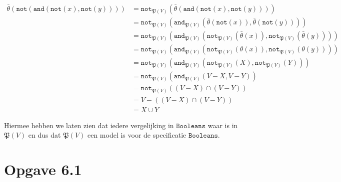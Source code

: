\documentclass[a4paper,11pt]{article}
\begin{document}
\begin{itemize}
\begin{align*}
\bar \theta(\texttt{not}(\texttt{and}(\texttt{not}(x), \texttt{not}(y))))
      &= \texttt{not}_{\mathfrak{P}(V)}(\bar \theta(\texttt{and}(\texttt{not}(x), \texttt{not}(y)))) \\
      &= \texttt{not}_{\mathfrak{P}(V)}(\texttt{and}_{\mathfrak{P}(V)}(\bar \theta(\texttt{not}(x)), \bar \theta(\texttt{not}(y)))) \\
      &= \texttt{not}_{\mathfrak{P}(V)}(\texttt{and}_{\mathfrak{P}(V)}(\texttt{not}_{\mathfrak{P}(V)}(\bar \theta(x)), \texttt{not}_{\mathfrak{P}(V)}(\bar \theta(y)))) \\
      &= \texttt{not}_{\mathfrak{P}(V)}(\texttt{and}_{\mathfrak{P}(V)}(\texttt{not}_{\mathfrak{P}(V)}(\theta(x)), \texttt{not}_{\mathfrak{P}(V)}(\theta(y)))) \\
      &= \texttt{not}_{\mathfrak{P}(V)}(\texttt{and}_{\mathfrak{P}(V)}(\texttt{not}_{\mathfrak{P}(V)}(X), \texttt{not}_{\mathfrak{P}(V)}(Y))) \\
      &= \texttt{not}_{\mathfrak{P}(V)}(\texttt{and}_{\mathfrak{P}(V)}(V - X, V - Y)) \\
      &= \texttt{not}_{\mathfrak{P}(V)}((V - X) \cap (V - Y)) \\
      &= V - ((V - X) \cap (V - Y)) \\
      &= X \cup Y
\end{align*}

\end{itemize}

Hiermee hebben we laten zien dat iedere vergelijking in $\texttt{Booleans}$
waar is in $\mathfrak{P}(V)$ en dus dat $\mathfrak{P}(V)$ een model is voor de
specificatie $\texttt{Booleans}$.




\section*{Opgave 6.1}
\end{document}
